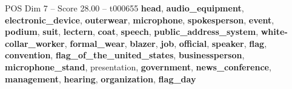 \begin{textsample}{POS Dim 7 – Score 28.00 – t000655}  \label{ex:f7_pos_014}
\textbf{head}, \textbf{audio\_equipment}, \textbf{electronic\_device}, \textbf{outerwear}, \textbf{microphone}, \textbf{spokesperson}, \textbf{event}, \textbf{podium}, \textbf{suit}, \textbf{lectern}, \textbf{coat}, \textbf{speech}, \textbf{public\_address\_system}, \textbf{white-collar\_worker}, \textbf{formal\_wear}, \textbf{blazer}, \textbf{job}, \textbf{official}, \textbf{speaker}, \textbf{flag}, \textbf{convention}, \textbf{flag\_of\_the\_united\_states}, \textbf{businessperson}, \textbf{microphone\_stand}, presentation, \textbf{government}, \textbf{news\_conference}, \textbf{management}, \textbf{hearing}, \textbf{organization}, \textbf{flag\_day}

\end{textsample}
